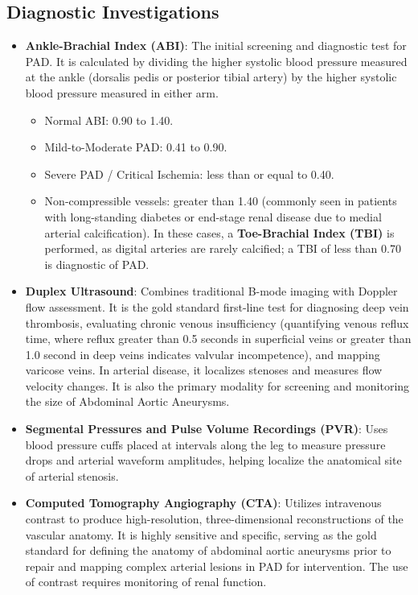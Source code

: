 \subsection*{Diagnostic Investigations}
\begin{itemize}
    \item \textbf{Ankle-Brachial Index (ABI)}: The initial screening and diagnostic test for PAD. It is calculated by dividing the higher systolic blood pressure measured at the ankle (dorsalis pedis or posterior tibial artery) by the higher systolic blood pressure measured in either arm.
    \begin{itemize}
        \item Normal ABI: 0.90 to 1.40.
        \item Mild-to-Moderate PAD: 0.41 to 0.90.
        \item Severe PAD / Critical Ischemia: less than or equal to 0.40.
        \item Non-compressible vessels: greater than 1.40 (commonly seen in patients with long-standing diabetes or end-stage renal disease due to medial arterial calcification). In these cases, a \textbf{Toe-Brachial Index (TBI)} is performed, as digital arteries are rarely calcified; a TBI of less than 0.70 is diagnostic of PAD.
    \end{itemize}
    \item \textbf{Duplex Ultrasound}: Combines traditional B-mode imaging with Doppler flow assessment. It is the gold standard first-line test for diagnosing deep vein thrombosis, evaluating chronic venous insufficiency (quantifying venous reflux time, where reflux greater than 0.5 seconds in superficial veins or greater than 1.0 second in deep veins indicates valvular incompetence), and mapping varicose veins. In arterial disease, it localizes stenoses and measures flow velocity changes. It is also the primary modality for screening and monitoring the size of Abdominal Aortic Aneurysms.
    \item \textbf{Segmental Pressures and Pulse Volume Recordings (PVR)}: Uses blood pressure cuffs placed at intervals along the leg to measure pressure drops and arterial waveform amplitudes, helping localize the anatomical site of arterial stenosis.
    \item \textbf{Computed Tomography Angiography (CTA)}: Utilizes intravenous contrast to produce high-resolution, three-dimensional reconstructions of the vascular anatomy. It is highly sensitive and specific, serving as the gold standard for defining the anatomy of abdominal aortic aneurysms prior to repair and mapping complex arterial lesions in PAD for intervention. The use of contrast requires monitoring of renal function.

\end{itemize}

